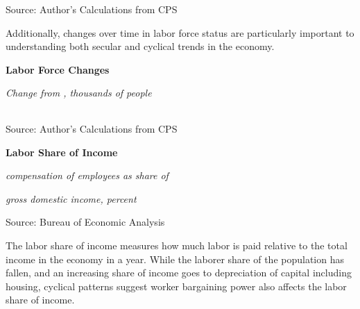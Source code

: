 \documentclass{report}
\makeatletter
\newcommand{\tbllink}[1]{\href{https://raw.githubusercontent.com/bdecon/US-chartbook/master/chartbook/data/#1}{\faTable}}
\newcommand*\short[1]{\expandafter\@gobbletwo\number\numexpr#1\relax}
\newcommand{\shdateaxisticks}{
		date coordinates in=x, axis line style={draw=none},
		xmax={2020-11-15},
		max space between ticks=40,	    
		xtick={{1990-01-01}, {1995-01-01}, {2000-01-01}, 
			{2005-01-01}, {2010-01-01}, {2015-01-01}, {2020-01-01}},
		minor xtick={},
		enlarge y limits={0.06}, enlarge x limits={0.01},
		}
\newcommand{\stdline}[4]{\addplot[very thick, no markers, color=#1] 
		table [x=#2, y=#3, col sep=comma] {#4};	}
\newcommand{\rbars}{
		\fill[color=black!10] (axis cs:{1990-07-01},\pgfkeysvalueof{/pgfplots/ymin}) rectangle 
			(axis cs:{1991-03-01}, \pgfkeysvalueof{/pgfplots/ymax});
		\fill[color=black!10] (axis cs:{2007-12-01},\pgfkeysvalueof{/pgfplots/ymin}) rectangle 
			(axis cs:{2009-07-01}, \pgfkeysvalueof{/pgfplots/ymax});
		\fill[color=black!10] (axis cs:{2001-03-01},\pgfkeysvalueof{/pgfplots/ymin}) rectangle 
			(axis cs:{2001-11-01}, \pgfkeysvalueof{/pgfplots/ymax});
		\fill[color=black!10] (axis cs:{2020-02-01},\pgfkeysvalueof{/pgfplots/ymin}) rectangle 
			(axis cs:{2020-10-01}, \pgfkeysvalueof{/pgfplots/ymax});}
\makeatother
\begin{document}
{{{{{{\begin{minipage}{0.76\textwidth}
\footnotesize{Source: Author's Calculations from CPS}

\vspace{4mm}

\small Additionally, changes over time in labor force status are particularly important to understanding both secular and cyclical trends in the economy. 

\vspace{3mm}

\noindent \normalsize \textbf{Labor Force Changes}

\footnotesize{\textit{Change from \unskip, thousands of people}}

\noindent {} \setlength{\tabcolsep}{3.0pt} \color{black!90}
		{\renewcommand{\arraystretch}{1.52}
		 \begin{tabular}{p{27.8mm} R{11.2mm} R{10.4mm} R{10.4mm} R{10.2mm} 
		 				 R{10.6mm} R{10.4mm} R{10.4mm}}
			 \hline
		\end{tabular}}
		
		\vspace{1mm}
		
\footnotesize{Source: Author's Calculations from CPS}

\end{minipage}
\newpage

\begin{minipage}{0.325\textwidth}
\normalsize \textbf{Labor Share of Income}

\footnotesize{\textit{compensation of employees as share of}}

\footnotesize{\textit{gross domestic income, percent}}

\hspace*{-2mm} 

\footnotesize{Source: Bureau of Economic Analysis} \hspace{2mm} \tbllink{laborshare.csv}

\end{minipage}\hspace{7mm}
\begin{minipage}{0.38\textwidth}
\small The labor share of income measures how much labor is paid relative to the total income in the economy in a year. While the laborer share of the population has fallen, and an increasing share of income goes to depreciation of capital including housing, cyclical patterns suggest worker bargaining power also affects the labor share of income.  
\end{minipage}

}}}}}}
\end{document}
